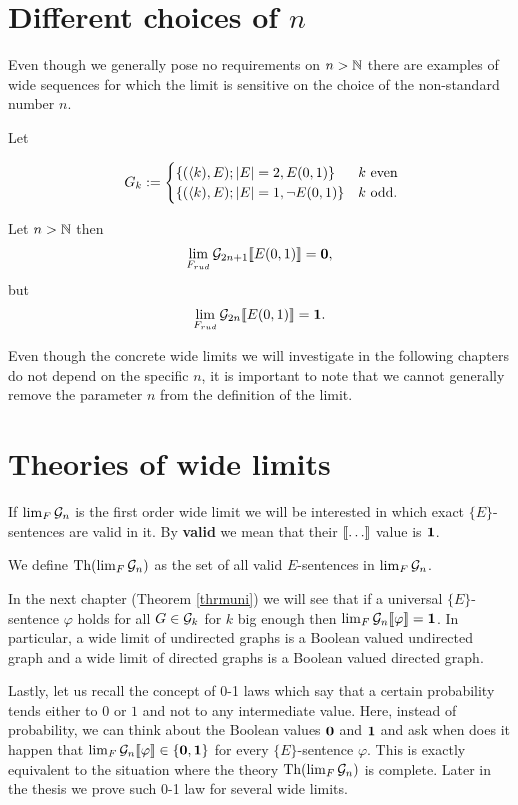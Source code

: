 \section{Different choices of $n$}

Even though we generally pose no requirements on $n>\mathbb{N}$ there are examples of wide sequences for which the limit is sensitive on the choice of the non-standard number $n$. 

\begin{exam}
Let 

\[\
G_{k}:=
\begin{cases}
\{(\langle k),E);\left|{E}\right|=2,E(0,1)\}&\text{$k$ even}\\
\{(\langle k),E);\left|{E}\right|=1,\lnot E(0,1)\}&\text{$k$ odd.}\\
\end{cases}\]

Let $n>\mathbb{N}$ then
\begin{align}
\lim_{F_{rud}}\mathcal{G}_{2n+1} \llbracket E(0,1)\rrbracket =\textbf{0},
\end{align}
but
\begin{align}
\lim_{F_{rud}}\mathcal{G}_{2n}\llbracket E(0,1)\rrbracket=\textbf{1}.
\end{align}

Even though the concrete wide limits we will investigate in the following chapters do not depend on the specific $n$, it is important to note that we cannot generally remove the parameter $n$ from the definition of the limit.
\end{exam}

\section{Theories of wide limits}

If $\lim_F\mathcal{G}_n$ is the first order wide limit we will be interested in which exact $\{E\}$-sentences are valid in it. By \textbf{valid} we mean that their $\llbracket\dots\rrbracket$ value is $\textbf{1}$.

\begin{defi}
We define $\text{Th}(\lim_F\mathcal{G}_n)$ as the set of all valid $E$-sentences in $\lim_{F}\mathcal{G}_n$.
\end{defi}

In the next chapter (Theorem \ref{thrmuni}) we will see that if a universal $\{E\}$-sentence $\varphi$ holds for all $G\in\mathcal{G}_k$ for $k$ big enough then $\lim_F\mathcal{G}_n\llbracket\varphi\rrbracket=\textbf{1}$. In particular, a wide limit of undirected graphs is a Boolean valued undirected graph and a wide limit of directed graphs is a Boolean valued directed graph.

Lastly, let us recall the concept of 0-1 laws which say that a certain probability tends either to $0$ or $1$ and not to any intermediate value. Here, instead of probability, we can think about the Boolean values $\textbf{0}$ and $\textbf{1}$ and ask when does it happen that $\lim_F\mathcal{G}_n\llbracket\varphi\rrbracket\in\{\textbf{0},\textbf{1}\}$ for every $\{E\}$-sentence $\varphi$. This is exactly equivalent to the situation where the theory $\text{Th}(\lim_F \mathcal{G}_n)$ is complete. Later in the thesis we prove such 0-1 law for several wide limits.
